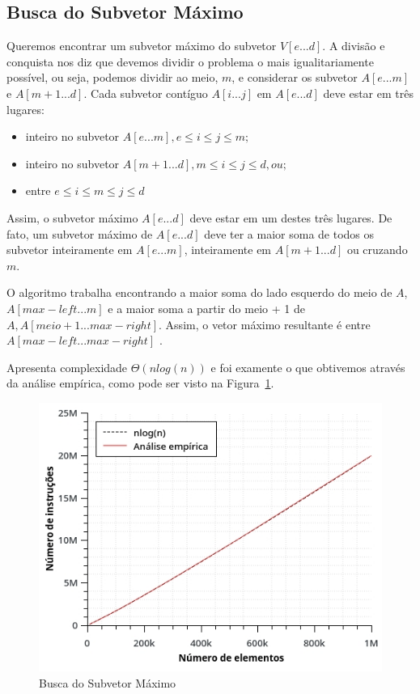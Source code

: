 \subsection{Busca do Subvetor Máximo}
Queremos encontrar um subvetor máximo do subvetor $V[e...d]$. A divisão e conquista nos diz que devemos dividir o problema o mais igualitariamente possível, ou seja, podemos dividir ao meio, $m$, e considerar os subvetor $A[e...m]$ e $A[m + 1...d]$. Cada subvetor contíguo $A[i...j]$ em $A[e...d]$ deve estar em três lugares:
\begin{itemize}
\item inteiro no subvetor $A[e...m], e \leq i \leq j \leq m;$
\item inteiro no subvetor $A[m + 1...d], m \leq i \leq j \leq d, ou;$
\item entre $e \leq i \leq m \leq j \leq d$
\end{itemize}

Assim, o subvetor máximo $A[e...d]$ deve estar em um destes três lugares. De fato, um subvetor máximo de $A[e...d]$ deve ter a maior soma de todos os subvetor inteiramente em $A[e...m]$, inteiramente em $A[m + 1...d]$ ou cruzando $m$.

O algoritmo trabalha encontrando a maior soma do lado esquerdo do meio de $A$, $A[max-left...m]$ e a maior soma a partir do meio + 1 de $A, A[meio+1...max-right]$. Assim, o vetor máximo resultante é entre $A[max-left...max-right]$ \cite{foleiss:01}.

Apresenta complexidade $\Theta(nlog(n))$ e foi examente o que obtivemos através da análise empírica, como pode ser visto na Figura~\ref{fig:subvetor}.
\begin{figure}[ht]
\centering
\includegraphics[width=.5\textwidth]{images/subvetor_graph.jpg}
\caption{Busca do Subvetor Máximo}
\label{fig:subvetor}
\end{figure}

